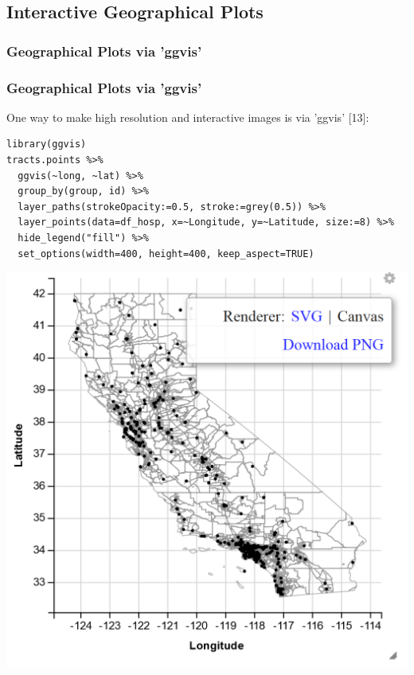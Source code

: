 \subsection{Interactive Geographical Plots}
\subsubsection{Geographical Plots via 'ggvis'}
\begin{frame}
	\frametitle{Geographical Plots via 'ggvis'}
One way to make high resolution and interactive images is via 'ggvis' [13]:

\begin{lstlisting}
library(ggvis)
tracts.points %>%
  ggvis(~long, ~lat) %>%
  group_by(group, id) %>%
  layer_paths(strokeOpacity:=0.5, stroke:=grey(0.5)) %>%
  layer_points(data=df_hosp, x=~Longitude, y=~Latitude, size:=8) %>%
  hide_legend("fill") %>%
  set_options(width=400, height=400, keep_aspect=TRUE)
\end{lstlisting}

\newpage
       \begin{center}
		\includegraphics[scale=0.65]{images/shapefile_v2.png}
	\end{center}
\end{frame}


